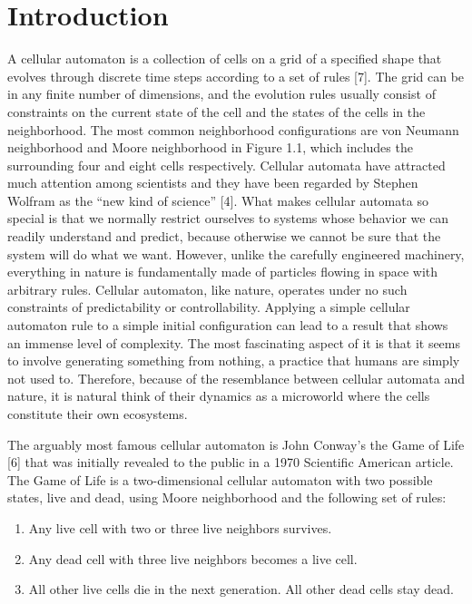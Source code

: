 \documentclass[12pt]{article}
\numberwithin{figure}{section} %
\begin{document}
\section{Introduction}
A cellular automaton is a collection of cells on a grid of a specified shape that evolves through discrete time steps according to a set of rules [7]. The grid can be in any finite number of dimensions, and the evolution rules usually consist of constraints on the current state of the cell and the states of the cells in the neighborhood. The most common neighborhood configurations are von Neumann neighborhood and Moore neighborhood in Figure 1.1, which includes the surrounding four and eight cells respectively. Cellular automata have attracted much attention among scientists and they have been regarded by Stephen Wolfram as the “new kind of science” [4]. What makes cellular automata so special is that we normally restrict ourselves to systems whose behavior we can readily understand and predict, because otherwise we cannot be sure that the system will do what we want. However, unlike the carefully engineered machinery, everything in nature is fundamentally made of particles flowing in space with arbitrary rules. Cellular automaton, like nature, operates under no such constraints of predictability or controllability. Applying a simple cellular automaton rule to a simple initial configuration can lead to a result that shows an immense level of complexity. The most fascinating aspect of it is that it seems to involve generating something from nothing, a practice that humans are simply not used to. Therefore, because of the resemblance between cellular automata and nature, it is natural think of their dynamics as a microworld where the cells constitute their own ecosystems. 

The arguably most famous cellular automaton is John Conway’s the Game of Life [6] that was initially revealed to the public in a 1970 Scientific American article. The Game of Life is a two-dimensional cellular automaton with two possible states, live and dead, using Moore neighborhood and the following set of rules: 
\begin{enumerate}[topsep=0pt,itemsep=-1ex,partopsep=1ex,parsep=1ex]
\item Any live cell with two or three live neighbors survives. 
\item Any dead cell with three live neighbors becomes a live cell. 
\item All other live cells die in the next generation. All other dead cells stay dead. 
\end{enumerate}
\end{document}
